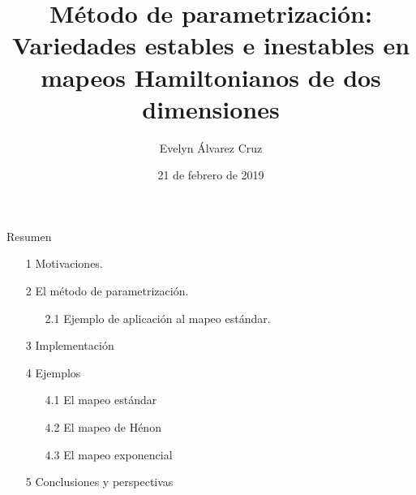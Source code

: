 \documentclass[11pt]{beamer}
\date{21 de febrero de 2019}	%
\title[Parametrizaci\'on]{M\'etodo de parametrizaci\'on:\\Variedades estables e inestables en mapeos Hamiltonianos de dos dimensiones}
\author[E. \'Alvarez]{Evelyn \'Alvarez Cruz} %
\institute[FC]{Facultad de Ciencias\\ Universidad Nacional Aut\'onoma de M\'exico} %
\theoremstyle{definition}
\begin{document}
	\begin{frame}[plain]
	\maketitle
\end{frame}
\begin{frame}{Resumen}	
\begin{itemize}
	\item[1] Motivaciones.
	\item[2] El m\'etodo de parametrizaci\'on.
	\begin{itemize}
		\item[2.1] Ejemplo de aplicaci\'on al mapeo est\'andar. 
	\end{itemize}
	\item[3] Implementaci\'on
	\item[4] Ejemplos
	\begin{itemize}
		\item[4.1] El mapeo est\'andar
		\item[4.2] El mapeo de H\'enon
		\item[4.3] El mapeo exponencial
	\end{itemize}
	\item[5] Conclusiones y perspectivas
\end{itemize}

\end{frame}



\end{document}
